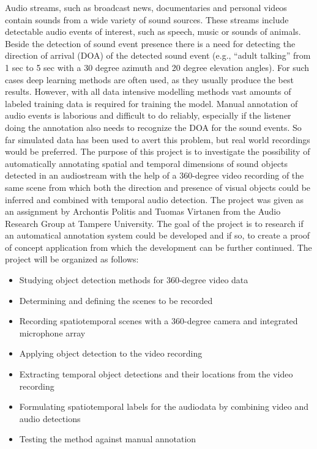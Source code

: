 Audio streams, such as broadcast news, documentaries and personal videos contain sounds from a wide variety of sound sources. These streams include detectable audio events of interest, such as speech, music or sounds of animals. Beside the detection of sound event presence there is a need for detecting the direction of arrival (DOA) of the detected sound event (e.g., “adult talking” from 1 sec to 5 sec with a 30 degree azimuth and 20 degree elevation angles). For such cases deep learning methods are often used, as they usually produce the best results. However, with all data intensive modelling methods vast amounts of labeled training data is required for training the model. Manual annotation of audio events is laborious and difficult to do reliably, especially if the listener doing the annotation also needs to recognize the DOA for the sound events. So far simulated data has been used to avert this problem, but real world recordings would be preferred. The purpose of this project is to investigate the possibility of automatically annotating spatial and temporal dimensions of sound objects detected in an audiostream with the help of a 360-degree video recording of the same scene from which both the direction and presence of visual objects could be inferred and combined with temporal audio detection. The project was given as an assignment by Archontis Politis and Tuomas Virtanen from the Audio Research Group at Tampere University. The goal of the project is to research if an automatical annotation system could be developed and if so, to create a proof of concept application from which the development can be further continued. The project will be organized as follows:

\begin{itemize}
	\item Studying object detection methods for 360-degree video data
	\item Determining and defining the scenes to be recorded
	\item Recording spatiotemporal scenes with a 360-degree camera and integrated microphone array
	\item Applying object detection to the video recording 
	\item Extracting temporal object detections and their locations from the video recording
	\item Formulating spatiotemporal labels for the audiodata by combining video and audio detections
	\item Testing the method against manual annotation
\end{itemize}